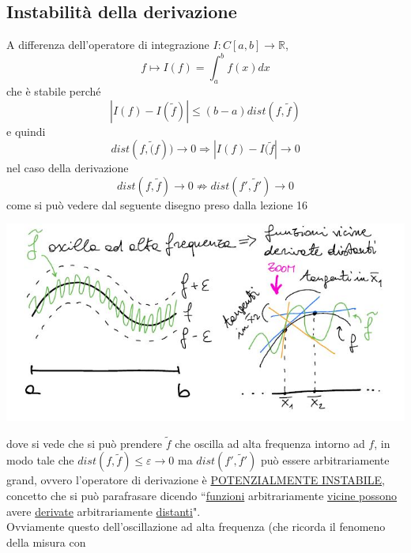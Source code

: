 \subsection{Instabilità della derivazione}
A differenza dell'operatore di integrazione $I:C[a,b]\rightarrow\mathbb{R}$,
\begin{equation*}
    f\longmapsto I(f)=\int_a^b f(x)dx
\end{equation*}
che è stabile perché
\begin{equation*}
    |I(f)-I(\tilde{f})|\leq(b-a)dist(f,\tilde{f})
\end{equation*}
e quindi 
\begin{equation*}
    dist(f,\tilde(f))\rightarrow0\Rightarrow|I(f)-I(\tilde{f}|\rightarrow0
\end{equation*}
nel caso della derivazione
\begin{equation*}
    dist(f,\tilde{f})\rightarrow0\nRightarrow dist(f',\tilde{f}')\rightarrow0
\end{equation*}
come si può vedere dal seguente disegno preso dalla lezione 16
\begin{center}
    \includegraphics[scale=0.6]{foto/calcolo55_2}
\end{center}
dove si vede che si può prendere $\tilde{f}$ che oscilla ad alta frequenza intorno ad $f$, in modo tale che $dist(f,\tilde{f})\leq\varepsilon\rightarrow0$ ma $dist(f',\tilde{f}')$ può essere arbitrariamente grand, ovvero l'operatore di derivazione è \uline{POTENZIALMENTE INSTABILE}, concetto che si può parafrasare dicendo ``\uline{funzioni} arbitrariamente \uline{vicine possono} avere \uline{derivate} arbitrariamente \uline{distanti}".\\Ovviamente questo dell'oscillazione ad alta frequenza (che ricorda il fenomeno della misura con
